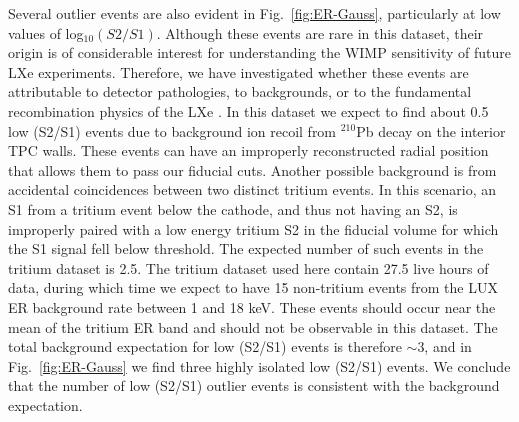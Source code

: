 Several outlier events are also evident in Fig.~\ref{fig:ER-Gauss}, particularly at low values of log$_{10}(S2/S1)$. Although these events are rare in this dataset, their origin is of considerable interest for understanding the WIMP sensitivity of future LXe experiments.  Therefore, we have investigated whether these events are attributable to detector pathologies, to backgrounds, or to the fundamental recombination physics of the LXe . In this dataset we expect to find about 0.5 low (S2/S1) events due to background ion recoil from $^{210}$Pb decay on the interior TPC walls. These events can have an improperly reconstructed radial position that allows them to pass our fiducial cuts.  Another possible background is from accidental coincidences between two distinct tritium events. In this scenario, an S1 from a tritium event below the cathode, and thus not having an S2, is improperly paired with a low energy tritium S2 in the fiducial volume for which the S1 signal fell below threshold. The expected number of such events in the tritium dataset is 2.5. The tritium dataset used here contain 27.5 live hours of data, during which time we expect to have 15 non-tritium events from the LUX ER background rate between 1 and 18 keV. These events should occur near the mean of the tritium ER band and should not be observable in this dataset. The total background expectation for low (S2/S1) events is therefore $\sim$3, and in Fig.~\ref{fig:ER-Gauss} we find three highly isolated low (S2/S1) events. We conclude that the number of low (S2/S1) outlier events is consistent with the background expectation.
